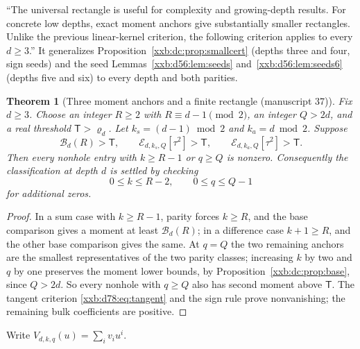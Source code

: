 \documentclass[11pt,a4paper]{article}
\numberwithin{equation}{section}
\newtheorem{theorem}{Theorem}[section]
\theoremstyle{definition}
\theoremstyle{remark}
\theoremstyle{plain}
\begin{document}
``The universal rectangle is useful for complexity and growing-depth results.
For concrete low depths, exact moment anchors give substantially smaller
rectangles. Unlike the previous linear-kernel criterion, the following
criterion applies to every $d\ge3$.''  It generalizes
Proposition~\ref{xxb:dc:prop:smallcert} (depths three and four, sign seeds)
and the seed Lemmas~\ref{xxb:d56:lem:seeds} and~\ref{xxb:d56:lem:seeds6}
(depths five and six) to every depth and both parities.

\begin{theorem}[Three moment anchors and a finite rectangle (manuscript 37)]\label{xxb:d78:thm:threeanchors}
Fix $d\ge3$.  Choose an integer $R\ge2$ with $R\equiv d-1\pmod2$, an integer
$Q>2d$, and a real threshold $\mathsf T>\varrho_d$.  Let $k_s=(d-1)\bmod2$ and
$k_a=d\bmod2$.  Suppose
\begin{equation}\label{xxb:d78:eq:anchors}
 \mathcal B_d(R)>\mathsf T,\qquad
 \mathcal E_{d,k_s,Q}[\tau^2]>\mathsf T,\qquad
 \mathcal E_{d,k_a,Q}[\tau^2]>\mathsf T.
\end{equation}
Then every nonhole entry with $k\ge R-1$ or $q\ge Q$ is nonzero.  Consequently
the classification at depth $d$ is settled by checking
\begin{equation}\label{xxb:d78:eq:practicalrectangle}
 0\le k\le R-2,\qquad 0\le q\le Q-1
\end{equation}
for additional zeros.
\end{theorem}
\begin{proof}
In a sum case with $k\ge R-1$, parity forces $k\ge R$, and the base comparison
gives a moment at least $\mathcal B_d(R)$; in a difference case $k+1\ge R$, and
the other base comparison gives the same.  At $q=Q$ the two remaining anchors
are the smallest representatives of the two parity classes; increasing $k$ by
two and $q$ by one preserves the moment lower bounds, by
Proposition~\ref{xxb:dc:prop:base}, since $Q>2d$.  So every nonhole with
$q\ge Q$ also has second moment above $\mathsf T$.  The tangent criterion
\eqref{xxb:d78:eq:tangent} and the sign rule prove nonvanishing; the
remaining bulk coefficients are positive.
\end{proof}

Write $V_{d,k,q}(u)=\sum_iv_iu^i$.
\end{document}
